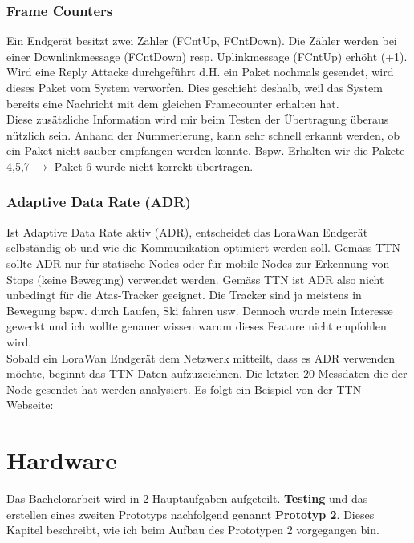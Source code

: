 \documentclass[11pt,english,german]{report}
\theoremstyle{definition}
\begin{document}
\subsection{Frame Counters}
Ein Endgerät besitzt zwei Zähler (FCntUp, FCntDown). Die Zähler werden bei einer Downlinkmessage (FCntDown) resp. Uplinkmessage (FCntUp) erhöht (+1).\\[0.3cm]
Wird eine Reply Attacke durchgeführt d.H. ein Paket nochmals gesendet, wird dieses Paket vom System verworfen. Dies geschieht deshalb, weil das System bereits eine Nachricht mit dem gleichen Framecounter erhalten hat.\\[0.3cm]
Diese zusätzliche Information wird mir beim Testen der Übertragung überaus nützlich sein. Anhand der Nummerierung, kann sehr schnell erkannt werden, ob ein Paket nicht sauber empfangen werden konnte. Bspw. Erhalten wir die Pakete 4,5,7 $\rightarrow$ Paket 6 wurde nicht korrekt übertragen.

\subsection{Adaptive Data Rate (ADR)}
Ist Adaptive Data Rate aktiv (ADR), entscheidet das LoraWan Endgerät selbständig ob und wie die Kommunikation optimiert werden soll. Gemäss TTN \cite{ADRTTN} sollte ADR nur für statische Nodes oder für mobile Nodes zur Erkennung von Stops (keine Bewegung) verwendet werden. Gemäss TTN ist ADR also nicht unbedingt für die Atas-Tracker geeignet. Die Tracker sind ja meistens in Bewegung bspw. durch Laufen, Ski fahren usw. Dennoch wurde mein Interesse geweckt und ich wollte genauer wissen warum dieses Feature nicht empfohlen wird.\\[0.3cm]
Sobald ein LoraWan Endgerät dem Netzwerk mitteilt, dass es ADR verwenden möchte, beginnt das TTN Daten aufzuzeichnen. Die letzten 20 Messdaten die der Node gesendet hat werden analysiert. Es folgt ein Beispiel von der TTN Webseite:


\chapter{Hardware}
Das Bachelorarbeit wird in 2 Hauptaufgaben aufgeteilt.\textbf{ Testing} und das erstellen eines zweiten Prototyps nachfolgend genannt \textbf{Prototyp 2}. Dieses Kapitel beschreibt, wie ich beim Aufbau des Prototypen 2 vorgegangen bin.
\end{document}
